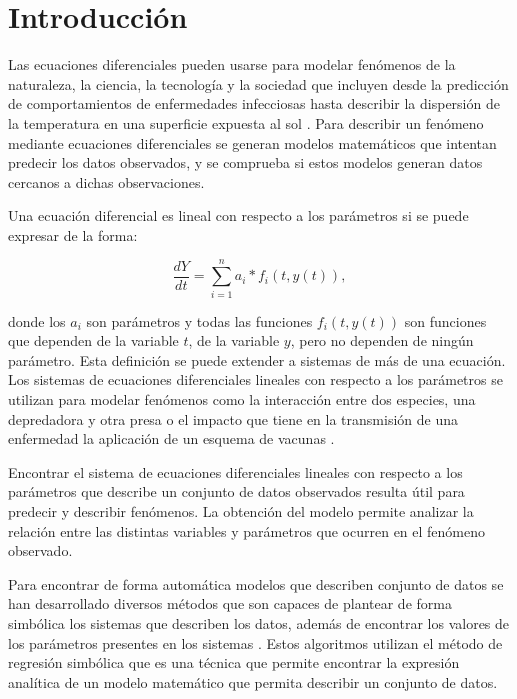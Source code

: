 \chapter*{Introducción}\label{chapter:introduction}

\qquad

Las ecuaciones diferenciales pueden usarse para modelar fenómenos de la naturaleza, la ciencia, la tecnología y la sociedad que incluyen desde la predicción de comportamientos de enfermedades infecciosas \cite{weiss2013sir} hasta describir la dispersión de la temperatura en una superficie expuesta al sol \cite{p-transferencia-calor}. Para describir un fenómeno mediante ecuaciones diferenciales se generan modelos matemáticos que intentan predecir los datos observados, y se comprueba si estos modelos generan datos cercanos a dichas observaciones.

Una ecuación diferencial es lineal con respecto a los parámetros si se puede expresar de la forma:

$$\frac{dY}{dt} = \sum_{i=1}^{n} a_i * f_i(t, y(t)),$$

donde los $a_i$ son parámetros y todas las funciones $f_i(t,y(t))$ son funciones que dependen de la variable $t$, de la variable $y$, pero no dependen de ningún parámetro. Esta definición se puede extender a sistemas de más de una ecuación. Los sistemas de ecuaciones diferenciales lineales con respecto a los parámetros se utilizan para modelar fenómenos como la interacción entre dos especies, una depredadora y otra presa \cite{Hoppensteadt:2006} o el impacto que tiene en la transmisión de una enfermedad la aplicación de un esquema de vacunas \cite{kuddus2021mathematical}.

Encontrar el sistema de ecuaciones diferenciales lineales con respecto a los parámetros que describe un conjunto de datos observados resulta útil para predecir y describir fenómenos. La obtención del modelo permite analizar la relación entre las distintas variables y parámetros que ocurren en el fenómeno observado.

Para encontrar de forma automática modelos que describen conjunto de datos se han desarrollado diversos métodos que son capaces de plantear de forma simbólica los sistemas que describen los datos, además de encontrar los valores de los parámetros presentes en los sistemas \cite{gplearn, schmidt2013eureqa}. Estos algoritmos utilizan el método de regresión simbólica que es una técnica que permite encontrar la expresión analítica de un modelo matemático que permita describir un conjunto de datos.


